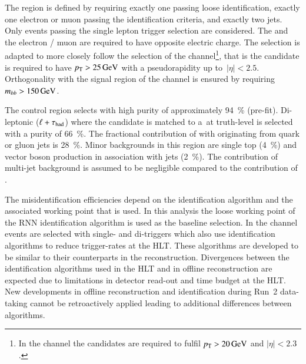The region is defined by requiring exactly one \tauhadvis passing
loose identification, exactly one electron or muon passing the
identification criteria, and exactly two \btagged
jets. Only events passing the single lepton trigger selection are
considered. The \tauhadvis and the electron / muon are required to
have opposite electric charge. The \tauhadvis selection is adapted to
more closely follow the selection of the \hadhad channel\footnote{In
  the \lephad channel the \tauhadvis candidates are required to fulfil
  $\pT > \SI{20}{\GeV}$ and $|\eta| < 2.3$.}, that is the \tauhadvis
candidate is required to have $p_{\text{T}} > \SI{25}{\ensuremath{\text{GeV}}}$ with a
pseudorapidity up to~$|\eta| < 2.5$. Orthogonality with the signal
region of the \lephad channel is ensured by requiring
$m_{bb} > \SI{150}{\ensuremath{\text{GeV}}}$.


The control region selects \ttbar with high purity of approximately
\SI{94}{\percent} (pre-fit). Di-leptonic \ttbar ($\ell + \tau_{\text{had}}$)
where the \tauhadvis candidate is matched to a~\tauhad at truth-level
is selected with a purity of \SI{66}{\percent}. The fractional
contribution of \ttbar with \tauhadvis originating from quark or gluon
jets is \SI{28}{\percent}. Minor backgrounds in this region are single
top (\SI{4}{\percent}) and vector boson production in association with
jets (\SI{2}{\percent}). The contribution of multi-jet background is
assumed to be negligible compared to the contribution of
\ttbar{}.


The \tauhadvis misidentification efficiencies depend on the \tauhadvis
identification algorithm and the associated working point that is
used. In this analysis the loose working point of the RNN \tauhadvis
identification algorithm is used as the baseline \tauhadvis
selection. In the \hadhad channel events are selected with single- and
di-\tauhadvis triggers which also use \tauhadvis identification
algorithms to reduce trigger-rates at the HLT. These algorithms are
developed to be similar to their counterparts in the \tauhadvis
reconstruction. Divergences between the identification algorithms used
in the HLT and in offline \tauhadvis reconstruction are expected due
to limitations in detector read-out and time budget at the HLT. New
developments in offline \tauhadvis reconstruction and identification
during Run~2 data-taking cannot be retroactively applied leading to
additional differences between algorithms.

